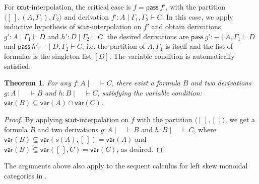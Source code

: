 \documentclass[submission,copyright,creativecommons]{eptcs}
\newtheorem*{theorem*}{Theorem}
\theoremstyle{definition}
\newcommand{\GG}{\Gamma}
\newcommand{\pass}{\mathsf{pass}}
\newcommand{\lolli}{\multimap}
\newcommand{\lleft}{{\lolli}\mathsf{L}}
\newcommand{\vdG}{\vdash}
\newcommand{\mf}[1]{\mathsf{#1}}
\newcommand{\vars}[1]{\mathsf{var}(#1)}
\begin{document}
For $\mf{ccut}$-interpolation, the critical case is $f = \pass \ f'$, with the partition $\langle [\ ], (A, \GG_1) , \GG_2 \rangle$ and derivation $f' : A \mid \GG_1 , \GG_2 \vdG C$.
In this case, we apply inductive hypothesis of $\mf{scut}$-interpolation on $f'$ and obtain derivations $g': A \mid \GG_1 \vdG D$ and $h' : D \mid \GG_2 \vdG C$, the desired derivations are $\pass \ g' : {-} \mid A , \GG_1 \vdG D$ and $\pass \ h' : {-} \mid D, \GG_2 \vdG C$, i.e. the partition of $A, \GG_1$ is itself and the list of formulae is the singleton list $[D]$.
The variable condition is automatically satisfied.
\begin{theorem*}
  For any $f: A \mid \quad \vdG C$, there exist a formula $B$ and two derivations $g: A\mid \quad \vdash B$ and $h: B\mid \quad \vdash C$, satisfying the variable condition: $\vars{B} \subseteq \vars{A} \cap \vars{C}$.
\end{theorem*}
\begin{proof}
  By applying $\mf{scut}$-interpolation on $f$ with the partition $\langle [\ ], [\ ]\rangle$, we get a formula $B$ and two derivations $g: A \mid \quad \vdG B$ and $h: B \mid \quad \vdG C$, where $\vars{B}\subseteq \vars{s(A), [\ ]} = \vars{A}$ and $\vars{B} \subseteq \vars{[\ ], C} = \vars{C}$, as desired. 
\end{proof}
The arguments above also apply to the sequent calculus for left skew monoidal categories in \cite{uustalu:sequent:2021}.
\end{document}
